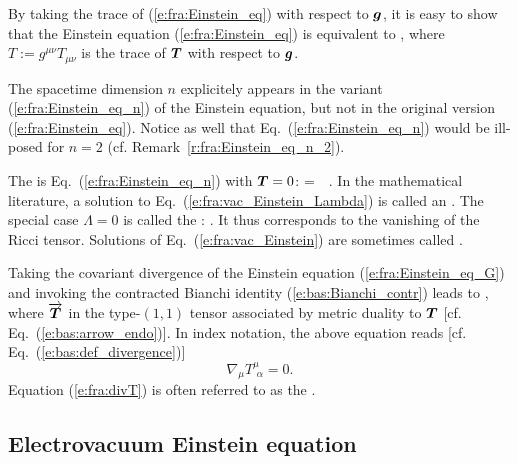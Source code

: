 By taking the trace of (\ref{e:fra:Einstein_eq}) with respect to $\bm{g}$, it is
easy to show that the Einstein equation (\ref{e:fra:Einstein_eq}) is
equivalent to
\be \label{e:fra:Einstein_eq_n}
    ,
\ee
where $T := g^{\mu\nu} T_{\mu\nu}$ is the trace of $\bm{T}$ with respect to
$\bm{g}$.

\begin{remark}
The spacetime dimension $n$ explicitely appears in the variant (\ref{e:fra:Einstein_eq_n})
of the Einstein equation, but not in the original version (\ref{e:fra:Einstein_eq}).
Notice as well that Eq.~(\ref{e:fra:Einstein_eq_n}) would be ill-posed for $n=2$
(cf. Remark~\ref{r:fra:Einstein_eq_n_2}).
\end{remark}

The  is
Eq.~(\ref{e:fra:Einstein_eq_n}) with $\bm{T}=0$:
\be \label{e:fra:vac_Einstein_Lambda}
      = \,\Lambda\,   .
\ee
In the mathematical literature, a solution to Eq.~(\ref{e:fra:vac_Einstein_Lambda})
is called an .
The special case $\Lambda=0$ is called the
:
 \be \label{e:fra:vac_Einstein}
    .
\ee
It thus corresponds to the vanishing of the Ricci tensor. Solutions of
Eq.~(\ref{e:fra:vac_Einstein}) are sometimes called
.

Taking the covariant divergence of the Einstein equation (\ref{e:fra:Einstein_eq_G})
and invoking the contracted Bianchi identity (\ref{e:bas:Bianchi_contr}) leads
to
\be \label{e:fra:divT}
    ,
\ee
where $\overrightarrow{\bm{T}}$ in the type-$(1,1)$ tensor associated by metric duality
to $\bm{T}$ [cf. Eq.~(\ref{e:bas:arrow_endo})]. In index notation, the above
equation reads [cf. Eq.~(\ref{e:bas:def_divergence})]
\[
    \nabla_\mu T^\mu_{\ \, \alpha} = 0 .
\]
Equation (\ref{e:fra:divT}) is often referred to as the .

\subsection{Electrovacuum Einstein equation} \label{e:fra:electrovacuum}

